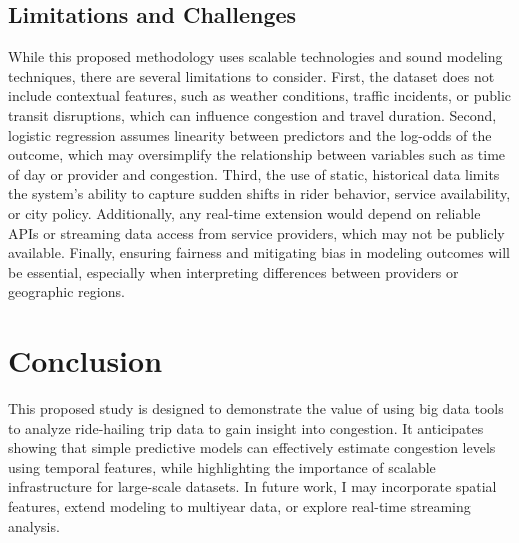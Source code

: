 \documentclass[12pt,letterpaper]{article}
\begin{document}
\subsection{Limitations and Challenges}
While this proposed methodology uses scalable technologies and sound modeling techniques, there are several limitations to consider. First, the dataset does not include contextual features, such as weather conditions, traffic incidents, or public transit disruptions, which can influence congestion and travel duration. Second, logistic regression assumes linearity between predictors and the log-odds of the outcome, which may oversimplify the relationship between variables such as time of day or provider and congestion. Third, the use of static, historical data limits the system's ability to capture sudden shifts in rider behavior, service availability, or city policy. Additionally, any real-time extension would depend on reliable APIs or streaming data access from service providers, which may not be publicly available. Finally, ensuring fairness and mitigating bias in modeling outcomes will be essential, especially when interpreting differences between providers or geographic regions.

\section{Conclusion}
This proposed study is designed to demonstrate the value of using big data tools to analyze ride-hailing trip data to gain insight into congestion. It anticipates showing that simple predictive models can effectively estimate congestion levels using temporal features, while highlighting the importance of scalable infrastructure for large-scale datasets. In future work, I may incorporate spatial features, extend modeling to multiyear data, or explore real-time streaming analysis.



\end{document}
